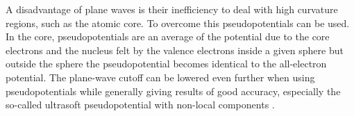 A disadvantage of plane waves is their inefficiency to deal with high curvature regions, such as the atomic core. To overcome this pseudopotentials can be used. In the core, pseudopotentials are an average of the potential due to the core electrons and the nucleus felt by the valence electrons inside a given sphere but outside the sphere the pseudopotential becomes identical to the all-electron potential. The plane-wave cutoff can be lowered even further when using pseudopotentials while generally giving results of good accuracy, especially the so-called ultrasoft pseudopotential with non-local components \cite{vanderbilt1990}.
